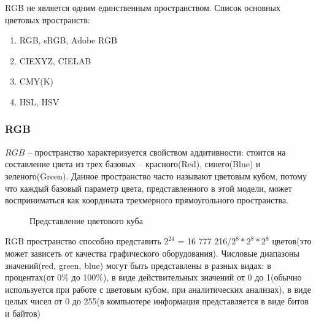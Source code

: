 RGB не является одним единственным пространством. Список основных цветовых пространств:
\begin{enumerate}
	\item RGB, sRGB, Adobe RGB
	\item CIEXYZ, CIELAB
	\item CMY(K)
	\item HSL, HSV
\end{enumerate}

\subsubsection{ RGB}
$RGB$ -- пространство характеризуется свойством аддитивности: стоится на составление цвета из трех базовых -- красного(Red), синего(Blue) и зеленого(Green).  Данное пространство часто называют цветовым кубом, потому что каждый базовый параметр цвета, представленного в этой модели, может восприниматься как координата трехмерного прямоугольного пространства.

\begin{figure}[ht!]%
    \centering
    \qquad
	\caption{Представление цветового куба}%
\end{figure}

RGB пространство способно представить \(2^{24}\) = 16 777 216/\(2^8 * 2^8 * 2^8\) цветов(это может зависеть от качества графического оборудования). Числовые диапазоны значений(red, green, blue) могут быть представлены в разных видах: в процентах(от 0\% до 100\%), в виде действительных значений от 0 до 1(обычно используется при работе с цветовым кубом, при аналитических анализах), в виде целых чисел от 0 до 255(в компьютере информация представляется в виде битов и байтов)


